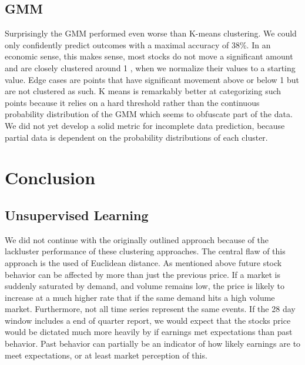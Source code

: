 \documentclass{article}
\begin{document}
\subsection{GMM}
	Surprisingly the GMM performed even worse than K-means clustering. We could only confidently predict outcomes with a maximal accuracy of 38\%. In an economic sense, this makes sense, most stocks do not move a significant amount and are closely clustered around 1 , when we normalize their values to a starting value. Edge cases are points that have significant movement above or below 1 but are not clustered as such. K means is remarkably better at categorizing such points because it relies on a hard threshold rather than the continuous probability distribution of the GMM which seems to obfuscate part of the data. We did not yet develop a solid metric for incomplete data prediction, because partial data is dependent on the probability distributions of each cluster. 

\section{Conclusion}
\subsection{Unsupervised Learning}
	We did not continue with the originally outlined approach because of the lackluster performance of these clustering approaches. The central flaw of this approach is the used of Euclidean distance. As mentioned above future stock behavior can be affected by more than just the previous price. If a market is suddenly saturated by demand, and volume remains low, the price is likely to increase at a much higher rate that if the same demand hits a high volume market. Furthermore, not all time series represent the same events. If the 28 day window includes a end of quarter report, we would expect that the stocks price would be dictated much more heavily by if earnings met expectations than past behavior. Past behavior can partially be an indicator of how likely earnings are to meet expectations, or at least market perception of this. 
\end{document}
